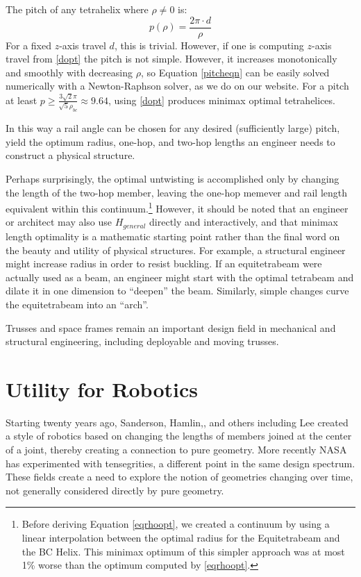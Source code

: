 \documentclass[11pt]{article}
\begin{document}
The pitch of any tetrahelix 
where $\rho \neq 0$ is:
\begin{equation}
  \label{pitcheqn}
p(\rho) = \frac{2 \pi  \cdot d}{\rho}
\end{equation}
For a fixed $z$-axis travel $d$, this is trivial.
However, if one is computing 
$z$-axis travel from \eqref{dopt} the pitch is not simple.
However, it increases monotonically and smoothly with decreasing $\rho$, so
Equation \eqref{pitcheqn} can be easily solved numerically with a Newton-Raphson
solver, as we do on our website.
For a pitch at least $ p \geq \frac{3  \sqrt{2}  \pi}{\sqrt{5}\rho_{bc}} \approx 9.64 $,
using \eqref{dopt} produces minimax optimal tetrahelices.

In this way a rail angle can be chosen for any desired (sufficiently large) pitch, yield
the optimum radius, one-hop, and two-hop lengths an engineer needs to
construct a physical structure.

Perhaps surprisingly, the optimal untwisting is accomplished only by
changing the length of the two-hop member, leaving the one-hop memever
and rail length equivalent within this continuum.\footnote{Before deriving Equation \eqref{eqrhoopt}, we created a continuum by
using a linear interpolation between the optimal radius for the
Equitetrabeam and the BC Helix. This minimax optimum of this simpler
approach was at most 1\% worse than the optimum computed by
\eqref{eqrhoopt}.}
 However, it should
be noted that an engineer or architect may also use $H_{general}$
directly and interactively, and that minimax length optimality is a
mathematic starting point rather than the final word on the beauty and utility of
physical structures. For example, a structural engineer might increase
radius in order to resist buckling. If an equitetrabeam were actually
used as a beam, an engineer might start with the optimal tetrabeam and
dilate it in one dimension to ``deepen'' the beam. Similarly, simple
changes curve the equitetrabeam into an ``arch''.

Trusses and space frames remain an important design field in
mechanical and structural engineering\cite{mikulas1985sequentially},
including deployable and moving trusses\cite{claypool2012readily}.


\section{Utility for Robotics}

Starting twenty years ago, Sanderson\cite{sanderson1996modular},
Hamlin,\cite{TetrobotBook}, and others including
Lee\cite{lee2002dynamic} created a style of robotics based on changing
the lengths of members joined at the center of a joint, thereby
creating a connection to pure geometry. More recently NASA has
experimented with tensegrities\cite{NTRT}, a different point in the
same design spectrum. These fields create a need to explore the notion
of geometries changing over time, not generally considered directly by
pure geometry.
\end{document}
